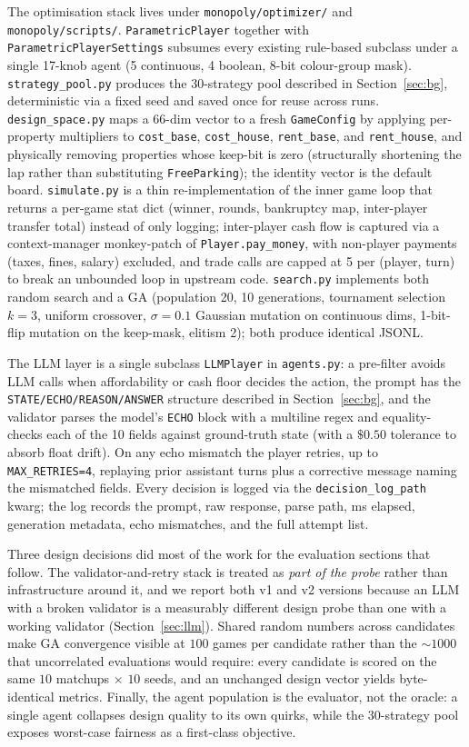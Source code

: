 \documentclass[10pt]{article}
\begin{document}
The optimisation stack lives under \texttt{monopoly/optimizer/} and
\texttt{monopoly/scripts/}. \texttt{ParametricPlayer} together with
\texttt{ParametricPlayerSettings} subsumes every existing rule-based
subclass under a single 17-knob agent (5 continuous, 4 boolean, 8-bit
colour-group mask). \texttt{strategy\_pool.py} produces the 30-strategy
pool described in Section~\ref{sec:bg}, deterministic via a fixed seed
and saved once for reuse across runs. \texttt{design\_space.py} maps a
66-dim vector to a fresh \texttt{GameConfig} by applying per-property
multipliers to \texttt{cost\_base}, \texttt{cost\_house},
\texttt{rent\_base}, and \texttt{rent\_house}, and physically removing
properties whose keep-bit is zero (structurally shortening the lap
rather than substituting \texttt{FreeParking}); the identity vector is
the default board. \texttt{simulate.py} is a thin re-implementation of
the inner game loop that returns a per-game stat dict (winner, rounds,
bankruptcy map, inter-player transfer total) instead of only logging;
inter-player cash flow is captured via a context-manager monkey-patch
of \texttt{Player.pay\_money}, with non-player payments (taxes, fines,
salary) excluded, and trade calls are capped at 5 per (player, turn)
to break an unbounded loop in upstream code. \texttt{search.py}
implements both random search and a GA (population 20, 10 generations,
tournament selection $k{=}3$, uniform crossover, $\sigma{=}0.1$
Gaussian mutation on continuous dims, 1-bit-flip mutation on the
keep-mask, elitism 2); both produce identical JSONL.

The LLM layer is a single subclass \texttt{LLMPlayer} in
\texttt{agents.py}: a pre-filter avoids LLM calls when affordability
or cash floor decides the action, the prompt has the
\texttt{STATE/ECHO/REASON/ANSWER} structure described in
Section~\ref{sec:bg}, and the validator parses the model's
\texttt{ECHO} block with a multiline regex and equality-checks each of
the 10 fields against ground-truth state (with a $\$0.50$ tolerance to
absorb float drift). On any echo mismatch the player retries, up to
\texttt{MAX\_RETRIES=4}, replaying prior assistant turns plus a
corrective message naming the mismatched fields. Every decision is
logged via the \texttt{decision\_log\_path} kwarg; the log records the
prompt, raw response, parse path, ms elapsed, generation metadata,
echo mismatches, and the full attempt list.

Three design decisions did most of the work for the evaluation
sections that follow. The validator-and-retry stack is treated as
\emph{part of the probe} rather than infrastructure around it, and we
report both v1 and v2 versions because an LLM with a broken validator
is a measurably different design probe than one with a working
validator (Section~\ref{sec:llm}). Shared random numbers across
candidates make GA convergence visible at $100$ games per candidate
rather than the $\sim 1000$ that uncorrelated evaluations would
require: every candidate is scored on the same $10$ matchups
$\times$ $10$ seeds, and an unchanged design vector yields
byte-identical metrics. Finally, the agent population is the
evaluator, not the oracle: a single agent collapses design quality to
its own quirks, while the 30-strategy pool exposes worst-case
fairness as a first-class objective.
\end{document}

